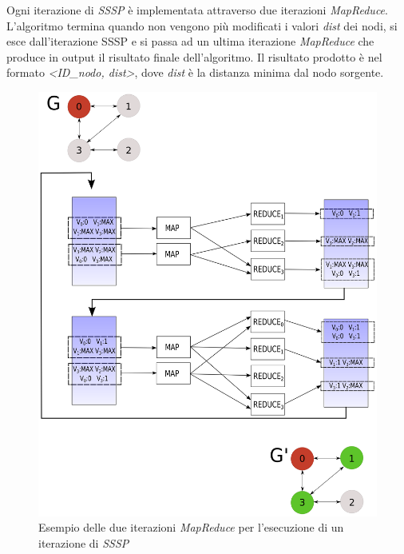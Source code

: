 \documentclass[LaM,binding=0.6cm]{sapthesis}
\begin{document}
Ogni iterazione di \textit{SSSP} è implementata attraverso due iterazioni \textit{MapReduce}. L'algoritmo termina quando non vengono più modificati i valori \textit{dist} dei nodi, si esce dall'iterazione SSSP e si passa ad un ultima iterazione \textit{MapReduce} che produce in output il risultato finale dell'algoritmo. Il risultato prodotto è nel formato \textit{<ID\_nodo, dist>}, dove \textit{dist} è la distanza minima dal nodo sorgente.



\begin{figure}
\centering
\includegraphics[width=1\textwidth]{MR-SSSP}
\caption{Esempio delle due iterazioni \textit{MapReduce} per l'esecuzione di un iterazione di \textit{SSSP}}
\label{fig:MRSSSP}
\end{figure}
\end{document}
